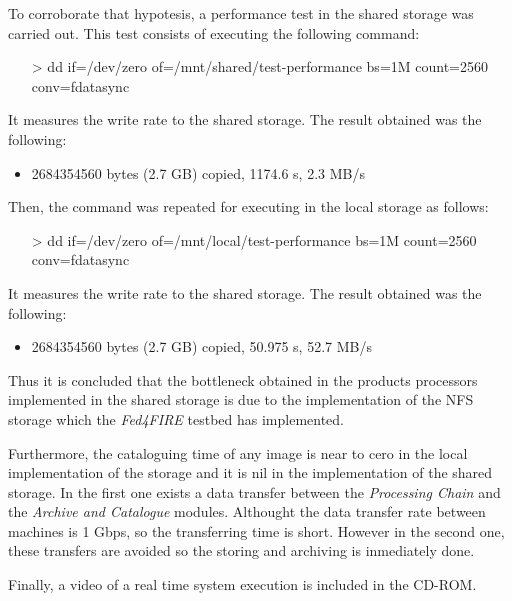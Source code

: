 To corroborate that hypotesis, a performance test in the shared storage was carried out. This test
consists of executing the following command:
\begin{itemize}
\item[>] dd if=/dev/zero of=/mnt/shared/test-performance bs=1M count=2560
  conv=fdatasync
\end{itemize}
It measures the write rate to the shared storage. The result obtained was the
following:
\begin{itemize}
\item 2684354560 bytes (2.7 GB) copied, 1174.6 s, 2.3 MB/s
\end{itemize}

Then, the command was repeated for executing in the local storage as follows:
\begin{itemize}
\item[>] dd if=/dev/zero of=/mnt/local/test-performance bs=1M count=2560
  conv=fdatasync
\end{itemize}

It measures the write rate to the shared storage. The result obtained was the
following:
\begin{itemize}
\item 2684354560 bytes (2.7 GB) copied, 50.975 s, 52.7 MB/s
\end{itemize}

Thus it is concluded that the bottleneck obtained in the products processors
implemented in the shared storage is due to the implementation of the \ac{NFS}
storage which the
\emph{Fed4FIRE} testbed has implemented.

Furthermore, the cataloguing time of any image is near to cero in the local
implementation of the storage and it is nil in the implementation of the shared
storage. In the first one exists a data transfer  between the \emph{Processing
  Chain} and the \emph{Archive and Catalogue} modules. Althought
the data transfer rate between \bonfire machines is 1 Gbps, so the transferring
time is short. However in the second one, these transfers are avoided so the
storing and archiving is inmediately done.

Finally, a video of a real time system execution is included in the CD-ROM.

